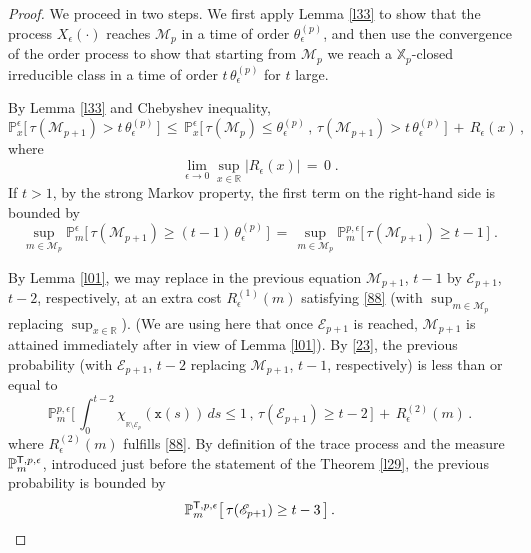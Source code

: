 \documentclass[reqno]{amsart}
\theoremstyle{plain}
\theoremstyle{definition}
\newcommand{\bb}[1]{{\mathbb #1}}
\newcommand{\ms}[1]{{\mathscr #1}}
\newcommand{\mss}[1]{{\textsf #1}}
\newcommand{\mtt}[1]{{\mathtt #1}}
\newcounter{as}[section]
\newcommand{\<}{\langle}
\renewcommand{\>}{\rangle}
\begin{document}
\begin{proof}
We proceed in two steps. We first apply Lemma \ref{l33} to show that
the process $X_\epsilon(\cdot)$ reaches $\ms M_p$ in a time of order
$\theta^{(p)}_\epsilon$, and then use the convergence of the order
process to show that starting from $\ms M_p$ we reach a
$\bb X_p$-closed irreducible class in a time of order
$t\, \theta^{(p)}_\epsilon$ for $t$ large.

By Lemma \ref{l33} and Chebyshev inequality,
\begin{equation*}
\bb P^{\epsilon}_x\big[ \, 
\tau (\ms M_{p+1}) > t \, \theta^{(p)}_\epsilon  \, \big]
\,\le\, \bb P^{\epsilon}_x\big[ \, \tau (\ms M_{p}) \le
\theta^{(p)}_\epsilon \,,\,
\tau (\ms M_{p+1}) > t \, \theta^{(p)}_\epsilon  \, \big]
\,+\, R_\epsilon (x)\,,
\end{equation*}
where
\begin{equation}
\label{88}
\lim_{\epsilon\to 0} \sup_{x\in \bb R} |R_\epsilon (x) | \,=\, 0\;. 
\end{equation}
If $t>1$, by the strong Markov property, the first term on the
right-hand side is bounded by
\begin{equation*}
\sup_{m\in \ms M_{p}} \bb P^{\epsilon}_m\big[ \, 
\tau (\ms M_{p+1}) \ge (t-1) \, \theta^{(p)}_\epsilon  \, \big]
\,=\,
\sup_{m\in \ms M_{p}} \bb P^{p,\epsilon}_m\big[ \, 
\tau (\ms M_{p+1}) \ge t-1 \, \big] \;.
\end{equation*}

By Lemma \ref{l01}, we may replace in the previous equation
$\ms M_{p+1}$, $t-1$ by $\ms E_{p+1}$, $t-2$, respectively, at an
extra cost $R^{(1)}_\epsilon (m)$ satisfying \eqref{88} (with
$\sup_{m\in \ms M_{p}}$ replacing $\sup_{x\in \bb R}$). (We are using
here that once $\ms E_{p+1}$ is reached, $\ms M_{p+1}$ is attained
immediately after in view of Lemma \ref{l01}). By \eqref{23}, the
previous probability (with $\ms E_{p+1}$, $t-2$ replacing
$\ms M_{p+1}$, $t-1$, respectively) is less than or equal to
\begin{equation*}
\bb P^{p,\epsilon}_m\Big[ \, \int_0^{t-2}
\chi_{_{\bb R\setminus \ms E_p}} (\mtt x(s))\,  ds
\le 1\, ,\, 
\tau (\ms E_{p+1}) \ge t-2 \, \Big]
\,+\, R^{(2)}_\epsilon (m)\,.
\end{equation*}
where $R^{(2)}_\epsilon (m)$ fulfills \eqref{88}. By definition of the
trace process and the measure $\bb P^{\mss T, p,\epsilon}_m$,
introduced just before the statement of the Theorem \ref{l29}, the
previous probability is bounded by
\begin{equation*}
\bb P^{\mss T, p,\epsilon}_m\big[ \, \tau (\ms E_{p+1}) \ge t-3 \,
\big] \,.
\end{equation*}


\end{proof}
\end{document}
